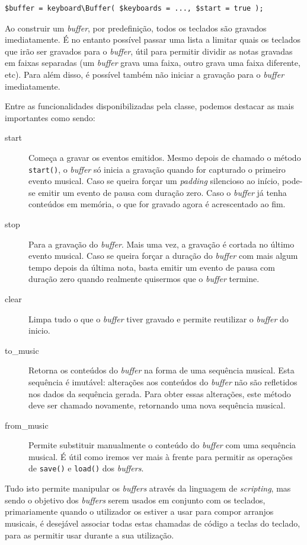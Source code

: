\begin{lstlisting}[caption={Instanciação de um \textit{buffer}}]
$buffer = keyboard\Buffer( $keyboards = ..., $start = true );
\end{lstlisting}
Ao construir um \textit{buffer}, por predefinição, todos os teclados são gravados imediatamente. É no entanto possível passar uma lista a limitar quais os teclados que irão ser gravados para o \textit{buffer}, útil para permitir dividir as notas gravadas em faixas separadas (um \textit{buffer} grava uma faixa, outro grava uma faixa diferente, etc). Para além disso, é possível também não iniciar a gravação para o \textit{buffer} imediatamente. 

Entre as funcionalidades disponibilizadas pela classe, podemos destacar as mais importantes como sendo:
\begin{description}
 \item[start] Começa a gravar os eventos emitidos. Mesmo depois de chamado o método \texttt{start()}, o \textit{buffer} só inicia a gravação quando for capturado o primeiro evento musical. Caso se queira forçar um \textit{padding} silencioso ao início, pode-se emitir um evento de pausa com duração zero. Caso o \textit{buffer} já tenha conteúdos em memória, o que for gravado agora é acrescentado ao fim.
 \item[stop] Para a gravação do \textit{buffer}. Mais uma vez, a gravação é cortada no último evento musical. Caso se queira forçar a duração do \textit{buffer} com mais algum tempo depois da última nota, basta emitir um evento de pausa com duração zero quando realmente quisermos que o \textit{buffer} termine.
 \item[clear] Limpa tudo o que o \textit{buffer} tiver gravado e permite reutilizar o \textit{buffer} do inicio.
 \item[to\_music] Retorna os conteúdos do \textit{buffer} na forma de uma sequência musical. Esta sequência é imutável: alterações aos conteúdos do \textit{buffer} não são refletidos nos dados da sequência gerada. Para obter essas alterações, este método deve ser chamado novamente, retornando uma nova sequência musical.
 \item[from\_music] Permite substituir manualmente o conteúdo do \textit{buffer} com uma sequência musical. É útil como iremos ver mais à frente para permitir as operações de \texttt{save()} e \texttt{load()} dos \textit{buffers}.
\end{description}

Tudo isto permite manipular os \textit{buffers} através da linguagem de \textit{scripting}, mas sendo o objetivo dos \textit{buffers} serem usados em conjunto com os teclados, primariamente quando o utilizador os estiver a usar para compor arranjos musicais, é desejável associar todas estas chamadas de código a teclas do teclado, para as permitir usar durante a sua utilização.

